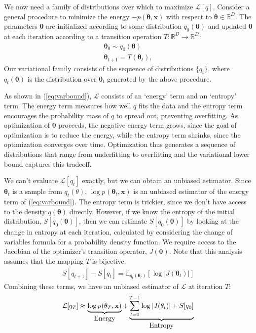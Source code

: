 \documentclass[]{article}
\newcommand{\vx}{\mathbf{x}}
\newcommand{\expectargs}[2]{\mathbb{E}_{#1} \left[ {#2} \right]}
\newcommand{\varL}{\mathcal{L}}
\newcommand{\data}{\vx}
\newcommand{\params}{\mathbf{\theta}}
\newcommand{\trans}{T}
\newcommand{\jointdist}{p(\params , \data)}
\newcommand{\subjointdist}[2]{p_{#1}(\params_{#2} , \data)}
\newcommand{\reals}{\mathbb{R}}
\begin{document}
We now need a family of distributions over which to maximize $\varL[q]$. Consider a
general procedure to minimize the energy $-\jointdist$ with respect to
$\params \in \reals^D$. The parameters $\params$ are initialized according to some
distribution $q_0(\params)$ and updated $\params$ at each iteration according to
a transition operation ${\trans : \reals^D \rightarrow \reals^D}$:
%
\begin{align}
\params_0 \sim q_0(\params) \nonumber \\
\params_{t + 1} = \trans(\params_t), \nonumber
\end{align}
%
Our variational family consists of the sequence of distributions $\{q_t\}$,
where $q_t(\params)$ is the distribution over $\params_t$ generated by the above
procedure.

As shown in (\ref{eq:varbound}), $\varL$ consists of an `energy' term and an
`entropy' term. The energy term measures how well $q$ fits the data and the
entropy term encourages the probability mass of $q$ to spread out, preventing
overfitting. As optimization of $\params$ proceeds, the negative energy term
grows, since the goal of optimization is to reduce the energy, while the entropy
term shrinks, since the optimization converges over time. Optimization thus
generates a sequence of distributions that range from underfitting to
overfitting and the variational lower bound captures this tradeoff.

We can't evaluate $\varL[q_t]$ exactly, but we can obtain an unbiased estimator.
Since $\params_t$ is a sample from $q_t(\theta)$, $\log \subjointdist{}{t}$ is
an unbiased estimator of the energy term of (\ref{eq:varbound}). The entropy term
is trickier, since we don't have access to the density $q(\params)$
directly. However, if we know the entropy of the initial distribution,
$S[q_0(\params)]$, then we can estimate $S[q_0(\params)]$ by
looking at the change in entropy at each iteration, calculated by considering
the change of variables formula for a probability density function.
We require access to the Jacobian of the optimizer's transition operator,
$J(\params)$. Note that this analysis assumes that the mapping $T$ is bijective.
%
\begin{align}
S[q_{t+1}] - S[q_t] =
  \expectargs{q_t(\params_t)}{\log
    \left| J(\params_t) \right|}
  \nonumber
\end{align}
%
Combining these terms, we have an unbiased estimator of $\varL$ at iteration $T$:
\begin{align}
\varL[q_T] \approx
  \underbrace{\log \subjointdist{}{T}}_{\textnormal{\normalsize Energy}} +
  \underbrace{\sum_{t=0}^{T-1} \log \left| J(\params_t) \right| + S[q_0]}_{\textnormal{\normalsize Entropy}}
  \nonumber
\end{align}
\end{document}
